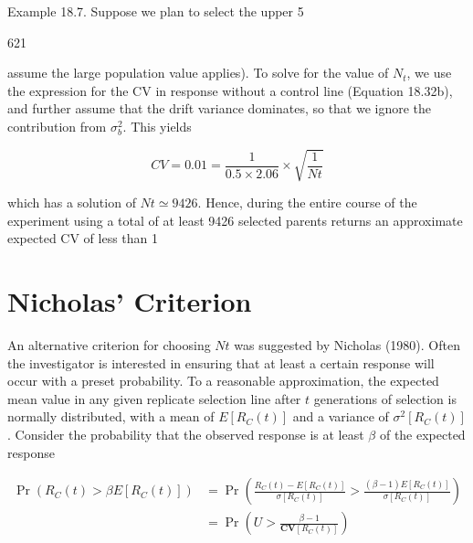 \documentclass{article}
\begin{document}
Example 18.7. Suppose we plan to select the upper 5%

621

assume the large population value applies). To solve for the value of  $ N_t $, we use the expression for the CV in response without a control line (Equation 18.32b), and further assume that the drift variance dominates, so that we ignore the contribution from  $ \sigma_b^2 $. This yields

\begin{equation}
CV=0.01=\frac{1}{0.5\times2.06}\times\sqrt{\frac{1}{Nt}}
\end{equation}

which has a solution of  $ Nt \simeq 9426 $. Hence, during the entire course of the experiment using a total of at least 9426 selected parents returns an approximate expected CV of less than 1%

\section{Nicholas' Criterion}
An alternative criterion for choosing  $ Nt $ was suggested by Nicholas (1980). Often the investigator is interested in ensuring that at least a certain response will occur with a preset probability. To a reasonable approximation, the expected mean value in any given replicate selection line after  $ t $ generations of selection is normally distributed, with a mean of  $ E[R_C(t)] $ and a variance of  $ \sigma^2[R_C(t)] $. Consider the probability that the observed response is at least  $ \beta $ of the expected response

\begin{equation}
\begin{aligned}\Pr\left(R_{C}(t)>\beta E[R_{C}(t)]\right)&=\Pr\left(\frac{R_{C}(t)-E[R_{C}(t)]}{\sigma\left[R_{C}(t)\right]}>\frac{(\beta-1)E[R_{C}(t)]}{\sigma\left[R_{C}(t)\right]}\right)\\&=\Pr\left(U>\frac{\beta-1}{\mathbf{CV}\left[R_{C}(t)\right]}\right)\end{aligned}
\tag{18.34}
\label{eq:18_34}
\end{equation}
\end{document}
